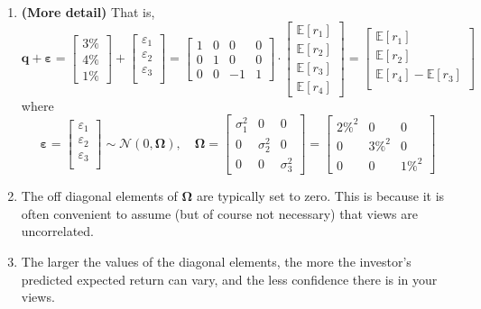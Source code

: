 \documentclass[13pt]{article}
\theoremstyle{definition}
\theoremstyle{remark}
\newenvironment{remark}
  {\pushQED{\qed}\renewcommand{\qedsymbol}{$\triangle$}\remarkx}
  {\popQED\endremarkx}
\begin{document}
\begin{remark}\hfill
\begin{enumerate}
    \item \textbf{(More detail)} That is, 
\[
\bm{q}+\bm{\varepsilon}=\begin{bmatrix}
3 \% \\
4 \% \\
1 \%
\end{bmatrix}+\begin{bmatrix}
\varepsilon_1 \\
\varepsilon_2 \\
\varepsilon_3 \\
\end{bmatrix}=\begin{bmatrix}
1 & 0 & 0 & 0 \\
0 & 1 & 0 & 0 \\
0 & 0 & -1 & 1
\end{bmatrix}\cdot \begin{bmatrix}
\mathbb{E}\left[r_{1}\right] \\
\mathbb{E}\left[r_{2}\right] \\
\mathbb{E}\left[r_{3}\right] \\
\mathbb{E}\left[r_{4}\right]
\end{bmatrix} = \begin{bmatrix}
\mathbb{E}\left[r_{1}\right] \\
\mathbb{E}\left[r_{2}\right] \\
\mathbb{E}\left[r_{4}\right]-\mathbb{E}\left[r_{3}\right] \\
\end{bmatrix} 
\] 
where
\[
\bm{\bm{\varepsilon}} = \begin{bmatrix}
\varepsilon_1 \\
\varepsilon_2 \\
\varepsilon_3 \\
\end{bmatrix} \sim \mathcal{N}(0, \mathbf{\Omega}), \quad \mathbf{\Omega}=\begin{bmatrix}
\sigma_1^{2} & 0 & 0 \\
0 & \sigma_2^{2} & 0 \\
0 & 0 & \sigma_3^{2}
\end{bmatrix}=\begin{bmatrix}
2 \%^{2} & 0 & 0 \\
0 & 3 \%^{2} & 0 \\
0 & 0 & 1 \%^{2}
\end{bmatrix}
\]
\item The off diagonal elements of $\mathbf{\Omega}$ are typically set to zero. This is because it is often convenient to assume (but of course not necessary) that views are uncorrelated.
\item The larger the values of the diagonal elements, the more the investor's predicted expected return can vary, and the less confidence there is in your views.
\end{enumerate}
\end{remark}
\end{document}
